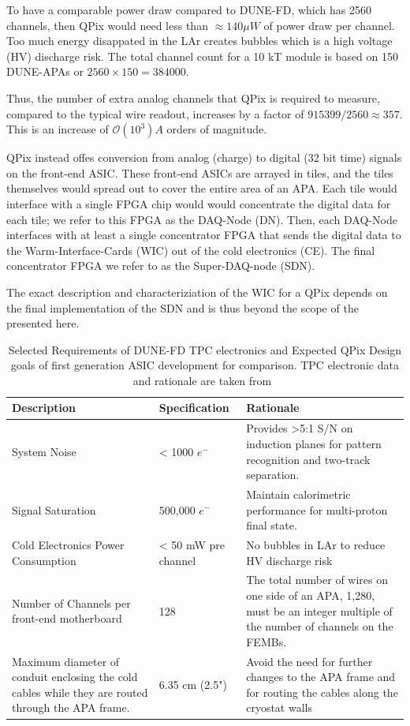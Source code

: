 To have a comparable power draw compared to DUNE-FD, which has 2560 channels, then QPix would need less than $\approx 140 \mu W$ of power draw per channel.
Too much energy disappated in the LAr creates bubbles which is a high voltage (HV) discharge risk.
The total channel count for a 10 kT module is based on 150 DUNE-APAs or $2560\times 150 = 384000$.

Thus, the number of extra analog channels that QPix is required to measure, compared to the typical wire readout, increases by a factor of $915399 / 2560 \approx 357$.
This is an increase of $\mathcal{O}(10^{3})A$ orders of magnitude.

QPix instead offes conversion from analog (charge) to digital (32 bit time) signals on the front-end ASIC.
These front-end ASICs are arrayed in tiles, and the tiles themselves would spread out to cover the entire area of an APA.
Each tile would interface with a single FPGA chip would would concentrate the digital data for each tile; we refer to this FPGA as the DAQ-Node (DN).
Then, each DAQ-Node interfaces with at least a single concentrator FPGA that sends the digital data to the Warm-Interface-Cards (WIC) out of the cold electronics (CE).
The final concentrator FPGA we refer to as the Super-DAQ-node (SDN).

The exact description and characteriziation of the WIC for a QPix depends on the final implementation of the SDN and is thus beyond the scope of the presented here.

\begin{table}
\begin{center}
\begin{tabular}{|| p{50mm} | p{50mm} | p{50mm} ||}
 \hline
 Description & Specification & Rationale \\ [0.5ex]
 \hline\hline
  System Noise & < 1000 $e^{-}$ & Provides >5:1 S/N on induction planes for pattern recognition and two-track separation. \\
 \hline
  Signal Saturation & 500,000 $e^{-}$ & Maintain calorimetric performance for multi-proton final state. \\
 \hline
  Cold Electronics Power Consumption & < 50 mW pre channel & No bubbles in LAr to reduce HV discharge risk\\
 \hline
  Number of Channels per front-end motherboard & 128 &  The total number of wires on one side of an APA, 1,280, must be an integer multiple of the number of channels on the FEMBs. \\
 \hline
Maximum diameter of conduit enclosing the cold cables while they are routed through the APA frame. & 6.35 cm (2.5") & Avoid the need for further changes to the APA frame and for routing the cables along the cryostat walls \\
 \hline
\end{tabular}
\caption{Selected Requirements of DUNE-FD TPC electronics and Expected QPix Design goals of first generation ASIC development for comparison. TPC electronic data and rationale are taken from~\citep{DUNE-FD_TDRv4:Abi_2020}}
\end{center}
\end{table}~\label{tab:dune_tpc_elec}

